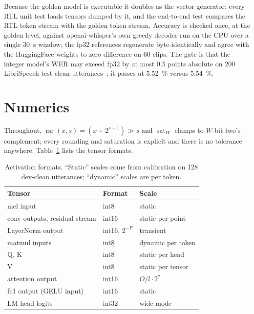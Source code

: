\documentclass[conference]{IEEEtran}
\newcommand{\rsr}{\operatorname{rsr}}
\newcommand{\sat}{\operatorname{sat}}
\begin{document}
Because the golden model is executable it doubles as the vector generator: every RTL unit test loads tensors dumped by it, and the end-to-end test compares the RTL token stream with the golden token stream. Accuracy is checked once, at the golden level, against openai-whisper's own greedy decoder run on the CPU over a single \SI{30}{s} window; the fp32 references regenerate byte-identically and agree with the HuggingFace weights to zero difference on 60 clips. The gate is that the integer model's WER may exceed fp32 by at most 0.5 points absolute on 200 LibriSpeech test-clean utterances~\cite{librispeech}; it passes at \SI{5.52}{\percent} versus \SI{5.54}{\percent}.

\section{Numerics}\label{sec:numerics}
Throughout, $\rsr(x,s)=(x+2^{s-1})\gg s$ and $\sat_W$ clamps to $W$-bit two's complement; every rounding and saturation is explicit and there is no tolerance anywhere. Table~\ref{tab:formats} lists the tensor formats.

\begin{table}[t]
\caption{Activation formats. ``Static'' scales come from calibration on 128 dev-clean utterances; ``dynamic'' scales are per token.}
\label{tab:formats}
\centering\small
\begin{tabular}{@{}lll@{}}
\toprule
Tensor & Format & Scale \\
\midrule
mel input & int8 & static \\
conv outputs, residual stream & int16 & static per point \\
LayerNorm output & int16, $2^{-F}$ & transient \\
matmul inputs & int8 & dynamic per token \\
Q, K & int8 & static per head \\
V & int8 & static per tensor \\
attention output & int16 & $O/l\cdot 2^{7}$ \\
fc1 output (GELU input) & int16 & static \\
LM-head logits & int32 & wide mode \\
\bottomrule
\end{tabular}
\end{table}
\end{document}
